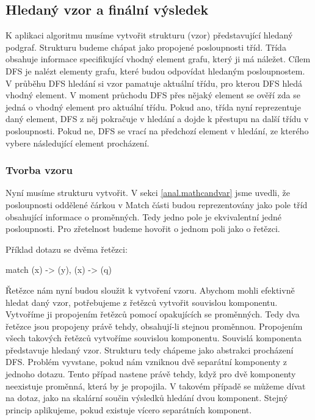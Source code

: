 \subsection{Hledaný vzor a finální výsledek} \label{anal.match.res}

K aplikaci algoritmu musíme vytvořit strukturu (vzor) představující hledaný podgraf.
Strukturu budeme chápat jako propojené posloupnosti tříd.
Třída obsahuje informace specifikující vhodný element grafu, který ji má náležet.
Cílem DFS je nalézt elementy grafu, které budou odpovídat hledaným posloupnostem.
V průběhu DFS hledání si vzor pamatuje aktuální třídu, pro kterou DFS hledá vhodný element.
V moment průchodu DFS přes nějaký element se ověří zda se jedná o vhodný element pro aktuální třídu.
Pokud ano, třída nyní reprezentuje daný element, DFS z něj pokračuje v hledání a dojde k přestupu na další třídu v posloupnosti.
Pokud ne, DFS se vrací na předchozí element v hledání, ze kterého vybere následující element procházení.

\subsubsection{Tvorba vzoru}

Nyní musíme strukturu vytvořit.
V sekci \ref{anal.mathcandvar} jsme uvedli, že posloupnosti oddělené čárkou v Match části budou reprezentovány jako pole tříd obsahující informace o proměnných.
Tedy jedno pole je ekvivalentní jedné posloupnosti.
Pro zřetelnost budeme hovořit o jednom poli jako o řetězci.

Příklad dotazu se dvěma řetězci:
\begin{code}
match (x) -> (y), (x) -> (q)
\end{code}

Řetězce nám nyní budou sloužit k vytvoření vzoru.
Abychom mohli efektivně hledat daný vzor, potřebujeme z řetězců vytvořit souvislou komponentu.
Vytvoříme ji propojením řetězců pomocí opakujících se proměnných.
Tedy dva řetězce jsou propojeny právě tehdy, obsahují-li stejnou proměnnou. 
Propojením všech takových řetězců vytvoříme souvislou komponentu.
Souvislá komponenta představuje hledaný vzor.
Strukturu tedy chápeme jako abstrakci procházení DFS.
Problém vyvstane, pokud nám vzniknou dvě separátní komponenty z jednoho dotazu.
Tento případ nastene právě tehdy, když pro dvě komponenty neexistuje proměnná, která by je propojila.
V takovém případě se můžeme dívat na dotaz, jako na skalární součin výsledků hledání dvou komponent.
Stejný princip aplikujeme, pokud existuje vícero separátních komponent.

